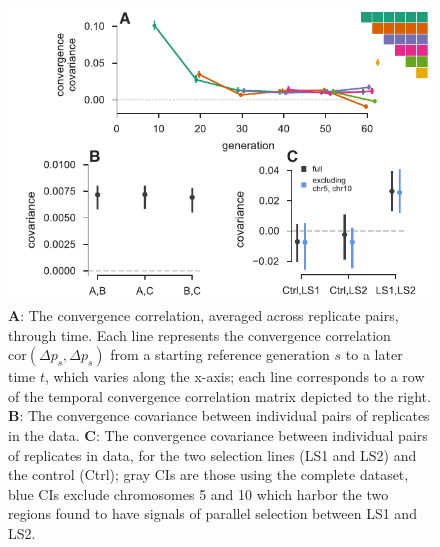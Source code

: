 \documentclass[11pt]{article}
\newcommand{\vince}[1]{\todo[size=\scriptsize, color=blue!50]{#1}}
\begin{document}
\begin{figure}[!htb]
  \centering
  \includegraphics[width=\textwidth]{figures/figure-2.pdf}

  \caption{{\bf A}: The convergence correlation, averaged across replicate
    pairs, through time. Each line represents the convergence correlation
    $\mathrm{cor}(\Delta p_{s}, \Delta p_{s})$ from a starting reference
    generation $s$ to a later time $t$, which varies along the x-axis; each
    line corresponds to a row of the temporal convergence correlation matrix
    depicted to the right.  {\bf B}: The convergence covariance between
    individual pairs of replicates in the \textcite{Kelly2019-dc} data. {\bf
    C}:  The convergence covariance between individual pairs of replicates in
    \parencite{Castro2019-uk} data, for the two selection lines  (LS1 and LS2)
    and the control (Ctrl); gray CIs are those using the complete dataset, blue
    CIs exclude chromosomes 5 and 10 which harbor the two regions
    \textcite{Castro2019-uk} found to have signals of parallel selection between
    LS1 and LS2.}

  \label{fig:figure-2}
\end{figure}

\end{document}
